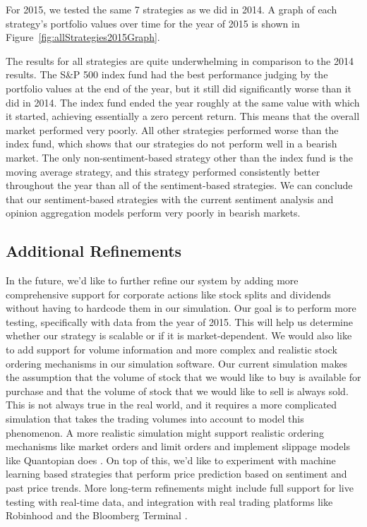 For 2015, we tested the same 7 strategies as we did in 2014.
A graph of each strategy's portfolio values over time for the year of 2015 is shown in Figure~\ref{fig:allStrategies2015Graph}.

The results for all strategies are quite underwhelming in comparison to the 2014 results.
The S\&P 500 index fund had the best performance judging by the portfolio values at the end of the year, but it still did significantly worse than it did in 2014.
The index fund ended the year roughly at the same value with which it started, achieving essentially a zero percent return.
This means that the overall market performed very poorly.
All other strategies performed worse than the index fund, which shows that our strategies do not perform well in a bearish market.
The only non-sentiment-based strategy other than the index fund is the moving average strategy, and this strategy performed consistently better throughout the year than all of the sentiment-based strategies.
We can conclude that our sentiment-based strategies with the current sentiment analysis and opinion aggregation models perform very poorly in bearish markets.

\subsection{Additional Refinements}

In the future, we'd like to further refine our system by adding more comprehensive support for corporate actions like stock splits and dividends without having to hardcode them in our simulation.
Our goal is to perform more testing, specifically with data from the year of 2015.
This will help us determine whether our strategy is scalable or if it is market-dependent.
We would also like to add support for volume information and more complex and realistic stock ordering mechanisms in our simulation software.
Our current simulation makes the assumption that the volume of stock that we would like to buy is available for purchase and that the volume of stock that we would like to sell is always sold.
This is not always true in the real world, and it requires a more complicated simulation that takes the trading volumes into account to model this phenomenon.
A more realistic simulation might support realistic ordering mechanisms like market orders and limit orders and implement slippage models like Quantopian does \cite{quantopianSlippage}.
On top of this, we'd like to experiment with machine learning based strategies that perform price prediction based on sentiment and past price trends.
More long-term refinements might include full support for live testing with real-time data, and integration with real trading platforms like Robinhood \cite{robinhood} and the Bloomberg Terminal \cite{terminal}. 

